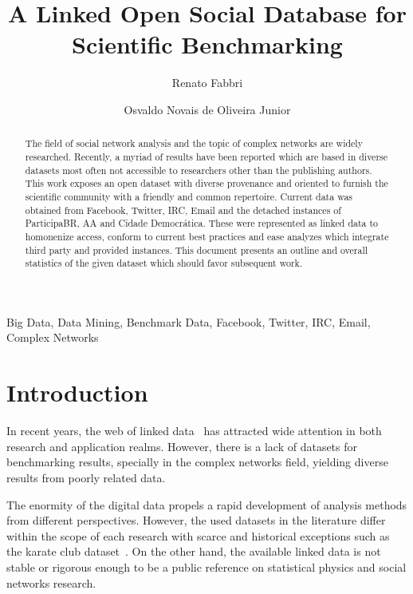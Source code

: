 \documentclass[review]{elsarticle}
\begin{document}
%
\begin{frontmatter}
%
\title{A Linked Open Social Database for Scientific Benchmarking}
%
\author[pwr]{Renato Fabbri}
%
\author[pwr]{Osvaldo Novais de Oliveira Junior}
%
\address[pwr]{S\~ao Carlos Institute of Physics, S\~ao Paulo
University, Brazil}
%
%
\begin{abstract}
The field of social network analysis and the topic of complex networks
are widely researched.
Recently, a myriad of results have been reported which are based in
diverse datasets most often not accessible to researchers other than the publishing authors.
This work exposes an open dataset with diverse provenance and oriented
to furnish the scientific community with a friendly and common repertoire.
Current data was obtained from Facebook, Twitter, IRC, Email and the
detached instances of ParticipaBR, AA and Cidade Democr\'atica.
These were represented as linked data to homonenize access,
conform to current best practices and ease analyzes which integrate third
party and provided instances.
This document presents an outline and overall statistics of the given
dataset which should favor subsequent work.
\end{abstract}
%
\begin{keyword}
Big Data, Data Mining, Benchmark Data, Facebook, Twitter, IRC, Email, Complex Networks
\end{keyword}

\end{frontmatter}

\section{Introduction}
In recent years, the web of linked data~\cite{lee1} has attracted wide attention in
both research and application realms.
However, there is a lack of datasets for benchmarking results,
specially in the complex networks field, yielding diverse results from 
poorly related data.

The enormity of the digital data propels a rapid development of analysis methods
from different perspectives.
However, the used datasets in the literature differ within the scope of each research with
scarce and historical exceptions such as the
karate club dataset~\cite{newmanBook}.
On the other hand, the available linked data is not 
stable or rigorous enough to be
a public reference on statistical physics and social networks research.
 
\end{document}
